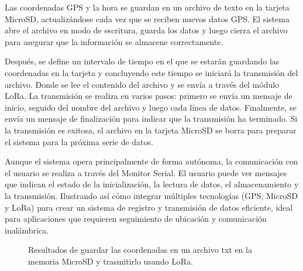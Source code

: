 \begin{itemize}
Las coordenadas GPS y la hora se guardan en un archivo de texto en la tarjeta MicroSD, actualizándose cada vez que se reciben nuevos datos GPS. El sistema abre el archivo en modo de escritura, guarda los datos y luego cierra el archivo para asegurar que la información se almacene correctamente.

Después, se define un intervalo de tiempo en el que se estarán guardando las coordenadas en la tarjeta y concluyendo este tiempo se iniciará la transmisión del archivo. Donde se lee el contenido del archivo y se envía a través del módulo LoRa. La transmisión se realiza en varios pasos: primero se envía un mensaje de inicio, seguido del nombre del archivo y luego cada línea de datos. Finalmente, se envía un mensaje de finalización para indicar que la transmisión ha terminado. Si la transmisión es exitosa, el archivo en la tarjeta MicroSD se borra para preparar el sistema para la próxima serie de datos.

Aunque el sistema opera principalmente de forma autónoma, la comunicación con el usuario se realiza a través del Monitor Serial. El usuario puede ver mensajes que indican el estado de la inicialización, la lectura de datos, el almacenamiento y la transmisión. Ilustrando así cómo integrar múltiples tecnologías (GPS, MicroSD y LoRa) para crear un sistema de registro y transmisión de datos eficiente, ideal para aplicaciones que requieren seguimiento de ubicación y comunicación inalámbrica.

\begin{figure}[H]
    \begin{minipage}{\textwidth}
        \centering
        \begin{minipage}{\textwidth}
            \centering
        \end{minipage}
    \end{minipage}
    \caption{Resultados de guardar las coordenadas en un archivo txt en la memoria MicroSD y trasmitirlo usando LoRa.}
\end{figure}


\end{itemize}
